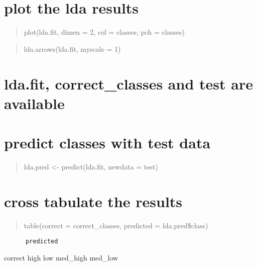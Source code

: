 \documentclass[]{article}
\begin{document}
\begin{quote}
\end{quote}

\section{plot the lda results}\label{plot-the-lda-results}

\begin{quote}
plot(lda.fit, dimen = 2, col = classes, pch = classes)
\end{quote}

\begin{quote}
lda.arrows(lda.fit, myscale = 1)
\end{quote}

\section{lda.fit, correct\_classes and test are
available}\label{lda.fit-correct_classes-and-test-are-available}

\begin{quote}
\end{quote}

\section{predict classes with test
data}\label{predict-classes-with-test-data}

\begin{quote}
lda.pred \textless{}- predict(lda.fit, newdata = test)
\end{quote}

\begin{quote}
\end{quote}

\section{cross tabulate the results}\label{cross-tabulate-the-results}

\begin{quote}
table(correct = correct\_classes, predicted = lda.pred\$class)
\end{quote}

\begin{verbatim}
      predicted 
\end{verbatim}

correct high low med\_high med\_low
\end{document}
